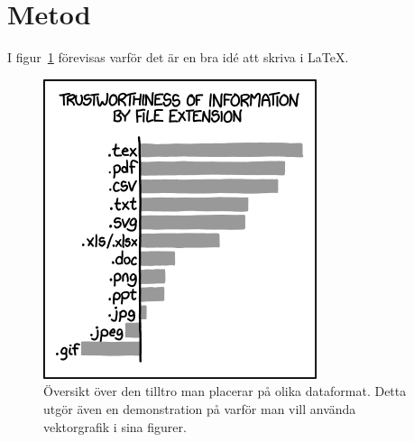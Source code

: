 \section{Metod}
\blindtext

I figur~\ref{fig:automation} förevisas varför det är en bra idé att skriva i \LaTeX.
\begin{figure}
\includegraphics[width=\textwidth]{fig/extensions} %
\caption{
	\label{fig:automation} 
	Översikt över den tilltro man placerar på olika dataformat. Detta utgör även en demonstration på varför man vill använda vektorgrafik i sina figurer.
}
\end{figure}

